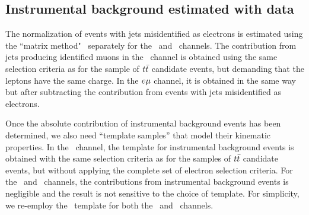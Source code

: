 \documentclass[aps,prd,twocolumn,showpacs,superscriptaddress,groupedaddress,floatfix]{revtex4}
\begin{document}
\subsection{Instrumental background estimated with data}
\label{sec:bkgdata}


The normalization of events
with jets misidentified as electrons is estimated using the ``matrix method"~\cite{Abazov:2007kg} separately for the \ee\ and \emu\ channels.
The contribution from jets producing  identified muons in the \mumu\ channel is obtained using the same selection criteria as for the sample of $t\bar{t}$ candidate events, but demanding that the leptons have the same charge. In the $e\mu$ channel, it is obtained in the same way but after subtracting  the contribution from  events with jets misidentified as electrons.

Once the absolute contribution of instrumental background events has been determined,
we also need ``template samples'' that model their kinematic properties.
In the \emu\ channel, the template for instrumental background events is obtained 
with 
the same selection criteria as for the samples of $t\bar{t}$ candidate events,
but without applying the complete set of electron selection criteria.
For the \mumu\ and \ee\ channels, the  contributions from instrumental background events is negligible and the result is not sensitive to the choice of template.
For simplicity, we re-employ the \emu\ template for both the \mumu\ and \ee\ channels.
\end{document}
